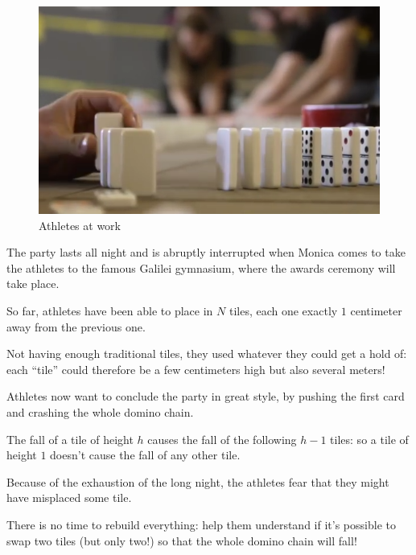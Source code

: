 \begin{figure}
  \vspace{-30pt}
  \begin{center}
    \includegraphics[width=0.9\linewidth]{domino.png}
    \caption{Athletes at work}
  \end{center}
\end{figure}

The party lasts all night and is abruptly interrupted when Monica
comes to take the athletes to the famous Galilei gymnasium, where the awards ceremony will take place.

 
So far, athletes have been able to place in $N$ tiles, each one
exactly $1$ centimeter away from the previous one.

Not having enough traditional tiles, they used whatever they could get a hold of:
each ``tile'' could therefore be a few centimeters high but also
several meters!

Athletes now want to conclude the party
in great style, by pushing the first card and crashing the whole domino chain.

The fall of a tile of height $h$ causes the fall of the following $h-1$ tiles:
so a tile of height $1$ doesn't cause the fall of any other tile.

Because of the exhaustion of the long night, the athletes fear that they might have misplaced
some tile.


There is no time to rebuild everything: help them understand if it's possible to swap two tiles (but only two!) so that the whole domino chain will fall!

